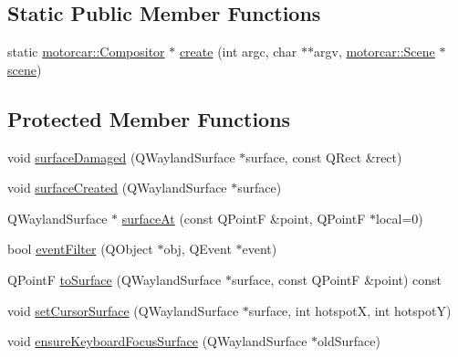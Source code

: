 \subsection*{Static Public Member Functions}
\begin{DoxyCompactItemize}
\item 
static \hyperlink{classmotorcar_1_1Compositor}{motorcar\-::\-Compositor} $\ast$ \hyperlink{classqtmotorcar_1_1QtWaylandMotorcarCompositor_ae15d45cc47f9be40a9e5f357e91599da}{create} (int argc, char $\ast$$\ast$argv, \hyperlink{classmotorcar_1_1Scene}{motorcar\-::\-Scene} $\ast$\hyperlink{classqtmotorcar_1_1QtWaylandMotorcarCompositor_a8bb6c8e6a7acad99b814b192534f3ee2}{scene})
\end{DoxyCompactItemize}
\subsection*{Protected Member Functions}
\begin{DoxyCompactItemize}
\item 
void \hyperlink{classqtmotorcar_1_1QtWaylandMotorcarCompositor_a32dbac4ee805821e74660dea97b05aa6}{surface\-Damaged} (Q\-Wayland\-Surface $\ast$surface, const Q\-Rect \&rect)
\item 
void \hyperlink{classqtmotorcar_1_1QtWaylandMotorcarCompositor_a4bda9a0989cb8c22e7b5d1a687763b61}{surface\-Created} (Q\-Wayland\-Surface $\ast$surface)
\item 
Q\-Wayland\-Surface $\ast$ \hyperlink{classqtmotorcar_1_1QtWaylandMotorcarCompositor_adcc9307301b665c9d5ccea73fef01453}{surface\-At} (const Q\-Point\-F \&point, Q\-Point\-F $\ast$local=0)
\item 
bool \hyperlink{classqtmotorcar_1_1QtWaylandMotorcarCompositor_a1d5c76d5c4dfd029d90803d889c07206}{event\-Filter} (Q\-Object $\ast$obj, Q\-Event $\ast$event)
\item 
Q\-Point\-F \hyperlink{classqtmotorcar_1_1QtWaylandMotorcarCompositor_af3c3c2e2dbfd18427c8b38f83f0fa01f}{to\-Surface} (Q\-Wayland\-Surface $\ast$surface, const Q\-Point\-F \&point) const 
\item 
void \hyperlink{classqtmotorcar_1_1QtWaylandMotorcarCompositor_a4555fa6ed0c867668fe735d9192331c7}{set\-Cursor\-Surface} (Q\-Wayland\-Surface $\ast$surface, int hotspot\-X, int hotspot\-Y)
\item 
void \hyperlink{classqtmotorcar_1_1QtWaylandMotorcarCompositor_ac2210c9eaefdc154eac4111807232eb0}{ensure\-Keyboard\-Focus\-Surface} (Q\-Wayland\-Surface $\ast$old\-Surface)
\end{DoxyCompactItemize}


